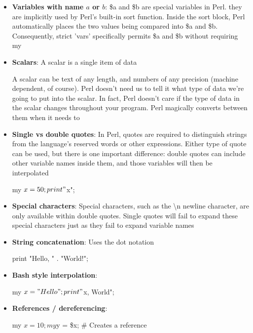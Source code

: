 \documentclass{report}
\begin{document}
\begin{itemize}
\begin{perlcode}
                my $x = 50; # Okay
                $y = 100; # Bad
            \end{perlcode}
        \item \textbf{Variables with name $a$ or $b$}: \$a and \$b are special variables in Perl. they are implicitly used by Perl's built-in sort function. Inside the sort block, Perl automatically places the two values being compared into \$a and \$b. Consequently, strict 'vars' specifically permits \$a and \$b without requiring my
        \item \textbf{Scalars}: A scalar is a single item of data
            \bigbreak \noindent 
            \bigbreak \noindent 
            A scalar can be text of any length, and numbers of any precision (machine dependent, of course). Perl doesn’t need us to tell it what type of data we’re going to put into the scalar. In fact, Perl doesn’t care if the type of data in the scalar changes throughout your program. Perl magically converts between them when it needs to
        \item \textbf{Single vs double quotes}: In Perl, quotes are required to distinguish strings from the language’s reserved words or other expressions. Either type of quote can be used, but there is one important difference: double quotes can include other variable names inside them, and those variables will then be interpolated
            \bigbreak \noindent 
            \begin{perlcode}
                my $x = 50;
                print "$x";
            \end{perlcode}
        \item \textbf{Special characters}: Special characters, such as the \textbackslash n newline character, are only available within double quotes. Single quotes will fail to expand these special characters just as they fail to expand variable names
        \item \textbf{String concatenation}: Uses the dot notation
            \bigbreak \noindent 
            \begin{perlcode}
                print "Hello, " . "World!";
            \end{perlcode}
        \item \textbf{Bash style interpolation}:
            \bigbreak \noindent 
            \begin{perlcode}
                my $x = "Hello";
                print "${x}, World";
            \end{perlcode}
        \item \textbf{References / dereferencing}: 
            \bigbreak \noindent 
            \begin{perlcode}
            my $x = 10;
            my $y = \$x; # Creates a reference


\end{perlcode}
\end{itemize}
\end{document}

